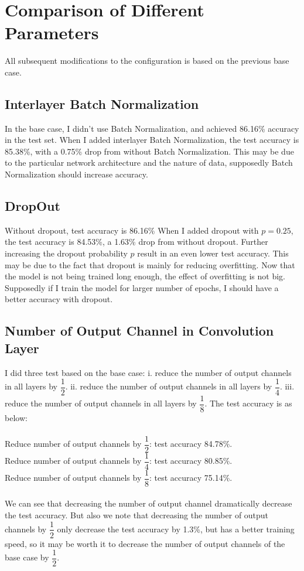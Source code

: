 \section{Comparison of Different Parameters}
All subsequent modifications to the configuration is based on the previous base case. 

\subsection{Interlayer Batch Normalization}
In the base case, I didn't use Batch Normalization, and achieved 86.16\% accuracy in the test set. When I added interlayer Batch Normalization, the test accuracy is 85.38\%, with a 0.75\% drop from without Batch Normalization. This may be due to the particular network architecture and the nature of data, supposedly Batch Normalization should increase accuracy. 

\subsection{DropOut}
Without dropout, test accuracy is 86.16\% When I added dropout with $p=0.25$, the test accuracy is 84.53\%, a 1.63\% drop from without dropout. Further increasing the dropout probability $p$ result in an even lower test accuracy. This may be due to the fact that dropout is mainly for reducing overfitting. Now that the model is not being trained long enough, the effect of overfitting is not big. Supposedly if I train the model for larger number of epochs, I should have a better accuracy with dropout. 

\subsection{Number of Output Channel in Convolution Layer}
I did three test based on the base case: i. reduce the number of output channels in all layers by $\dfrac{1}{2}$. ii. reduce the number of output channels in all layers by $\dfrac{1}{4}$. iii. reduce the number of output channels in all layers by $\dfrac{1}{8}$.  The test accuracy is as below: \\ \\
Reduce number of output channels by $\dfrac{1}{2}$: test accuracy 84.78\%. \\
Reduce number of output channels by $\dfrac{1}{4}$: test accuracy 80.85\%. \\
Reduce number of output channels by $\dfrac{1}{8}$: test accuracy 75.14\%. \\ \\
We can see that decreasing the number of output channel dramatically decrease the test accuracy. But also we note that decreasing the number of output channels by $\dfrac{1}{2}$ only decrease the test accuracy by 1.3\%, but has a better training speed, so it may be worth it to decrease the number of output channels of the base case by $\dfrac{1}{2}$.

